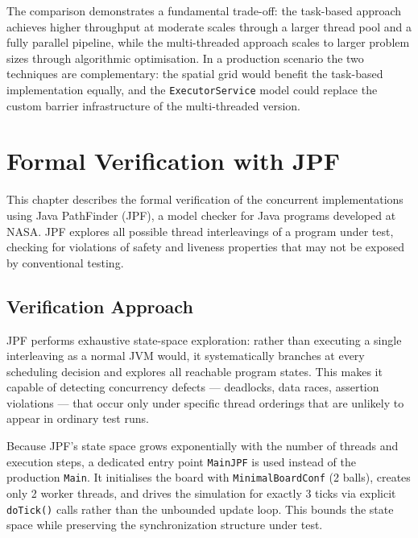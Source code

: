 \documentclass[12pt,a4paper]{article}
\begin{document}
The comparison demonstrates a fundamental trade-off: the task-based
approach achieves higher throughput at moderate scales through a larger
thread pool and a fully parallel pipeline, while the multi-threaded
approach scales to larger problem sizes through algorithmic optimisation.
In a production scenario the two techniques are complementary: the
spatial grid would benefit the task-based implementation equally, and
the \texttt{ExecutorService} model could replace the custom barrier
infrastructure of the multi-threaded version.
\section{Formal Verification with JPF}

This chapter describes the formal verification of the concurrent
implementations using Java PathFinder (JPF), a model checker for Java
programs developed at NASA. JPF explores all possible thread interleavings
of a program under test, checking for violations of safety and liveness
properties that may not be exposed by conventional testing.

\subsection{Verification Approach}

JPF performs exhaustive state-space exploration: rather than executing a
single interleaving as a normal JVM would, it systematically branches at
every scheduling decision and explores all reachable program states. This
makes it capable of detecting concurrency defects — deadlocks, data races,
assertion violations — that occur only under specific thread orderings that
are unlikely to appear in ordinary test runs.

Because JPF's state space grows exponentially with the number of threads
and execution steps, a dedicated entry point \texttt{MainJPF} is used
instead of the production \texttt{Main}. It initialises the board with
\texttt{MinimalBoardConf} (2 balls), creates only 2 worker threads, and
drives the simulation for exactly 3 ticks via explicit \texttt{doTick()}
calls rather than the unbounded update loop. This bounds the state space
while preserving the synchronization structure under test.
\end{document}

